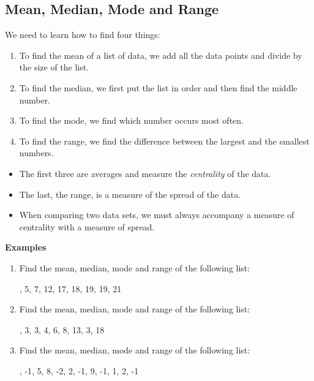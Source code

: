 \documentclass{article}
\begin{document}
\subsection{Mean, Median, Mode and Range}

We need to learn how to find four things:

\begin{enumerate}
    \item To find the mean of a list of data, we add all the data points and divide by the size of the list.

    \item To find the median, we first put the list in order and then find the middle number.

    \item To find the mode, we find which number occurs most often.

    \item To find the range, we find the difference between the largest and the smallest numbers.
\end{enumerate}

\vspace{5mm}

\begin{itemize}
    \item[] The first three are averages and measure the \textit{centrality} of the data.
    \item[] The last, the range, is a measure of the spread of the data.
    \item[] When comparing two data sets, we must always accompany a measure of centrality with a measure of spread.
\end{itemize}

\vspace{5mm}

\textbf{Examples}

\begin{enumerate}
    \item Find the mean, median, mode and range of the following list: 
    
    \vspace{1mm}
    , 5, 7, 12, 17, 18, 19, 19, 21
    \vspace{20mm}
    
    \raggedright
    \item Find the mean, median, mode and range of the following list: 
    
    \vspace{1mm}
    , 3, 3, 4, 6, 8, 13, 3, 18
    \vspace{20mm}
    
    \raggedright
    \item Find the mean, median, mode and range of the following list:
    
    \vspace{1mm}
    , -1, 5, 8, -2, 2, -1, 9, -1, 1, 2, -1
    
\end{enumerate}
\end{document}
